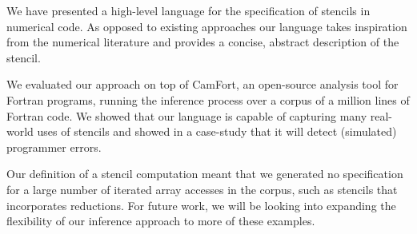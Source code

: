\documentclass[10pt,preprint,numbers]{sigplanconf}
\theoremstyle{definition}
\begin{document}
We have presented a high-level language for the specification of
stencils in numerical code. As opposed to existing approaches our
language takes inspiration from the numerical literature and provides
a concise, abstract description of the stencil.

We evaluated our approach on top of CamFort, an open-source analysis
tool for Fortran programs, running the inference process over a corpus
of a million lines of Fortran code. We showed that our language is
capable of capturing many real-world uses of stencils and showed in a
case-study that it will detect (simulated) programmer errors.

Our definition of a stencil computation meant that we generated no
specification for a large number of iterated array accesses in the
corpus, such as stencils that incorporates reductions. For
future work, we will be looking into expanding the flexibility of 
our inference approach to more of these examples. 


\end{document}
